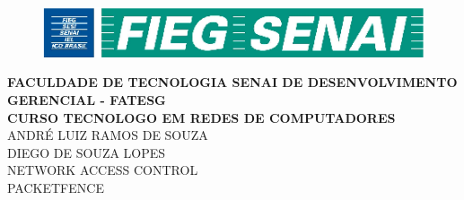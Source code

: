 \begin{titlepage}

\vfill
\begin{center}
\begin{figure}
\begin{center}
 \includegraphics[bb=0 0 328 43,keepaspectratio=true]{logoSenai.png}
\end{center}
\end{figure}

\textbf
{
FACULDADE DE TECNOLOGIA SENAI DE DESENVOLVIMENTO GERENCIAL - FATESG \\
CURSO TECNOLOGO EM REDES DE COMPUTADORES
}
\\[5cm]
{\large ANDRÉ LUIZ RAMOS DE SOUZA \\ DIEGO DE SOUZA LOPES}
\\[5cm]
{\huge NETWORK ACCESS CONTROL \\ PACKETFENCE}

\end{center}

\end{titlepage}